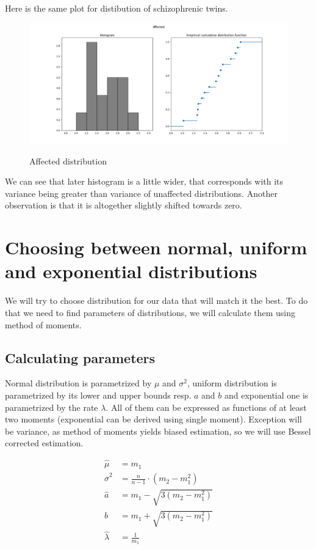 \documentclass[12pt,a4paper]{article} %
\begin{document}
Here is the same plot for distibution of schizophrenic twins.
\begin{figure}[h]
  \centering
  \includegraphics[scale=0.4]{./img/affected_hist_ecdf.png}
  \label{fig:aff_ecdf}
  \caption{Affected distribution}
\end{figure}

We can see that later histogram is a little wider, that corresponds with its variance being greater than variance of unaffected distributions. Another observation is that it is altogether slightly shifted towards zero.

\section{Choosing between normal, uniform and exponential distributions}

We will try to choose distribution for our data that will match it the best. To do that we need to find parameters of distributions, we will calculate them using method of moments. %

\subsection{Calculating parameters}

Normal distribution is parametrized by $\mu$ and $\sigma^2$, uniform distribution is parametrized by its lower and upper bounds resp. $a$ and $b$ and exponential one is parametrized by the rate $\lambda$. All of them can be expressed as functions of at least two moments (exponential can be derived using single moment). Exception will be variance, as method of moments yields biased estimation, so we will use Bessel corrected estimation.

\begin{align*}
  \hat \mu &= m_1 \\
  \hat \sigma^2 &= \frac{n}{n - 1} \cdot (m_2 - m_1^2) \\
  \hat a &= m_1 - \sqrt{3(m_2 - m_1^2)}\\ 
  \hat b &= m_1 + \sqrt{3(m_2 - m_1^2)}\\ 
  \hat \lambda &= \frac{1}{m_1}
\end{align*}
\end{document}
